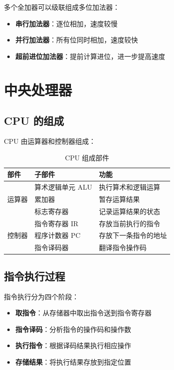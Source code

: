 \documentclass[12pt,UTF8]{ctexbook}
\begin{document}
多个全加器可以级联组成多位加法器：

\begin{itemize}[leftmargin=2cm]
    \item \textbf{串行加法器}：逐位相加，速度较慢
    \item \textbf{并行加法器}：所有位同时相加，速度较快
    \item \textbf{超前进位加法器}：提前计算进位，进一步提高速度
\end{itemize}

\chapter{中央处理器}
\label{chap:cpu}

\section{CPU 的组成}

CPU 由运算器和控制器组成：

\begin{table}[htbp]
    \centering
    \caption{CPU 组成部件}
    \begin{tabular}{|p{3cm}|p{3cm}|p{4cm}|}
        \hline
        \textbf{部件} & \textbf{子部件} & \textbf{功能} \\
        \hline
        \multirow{3}{*}{运算器} & 算术逻辑单元 ALU & 执行算术和逻辑运算 \\
        \cline{2-3}
         & 累加器 & 暂存运算结果 \\
        \cline{2-3}
         & 标志寄存器 & 记录运算结果的状态 \\
        \hline
        \multirow{3}{*}{控制器} & 指令寄存器 IR & 存放当前执行的指令 \\
        \cline{2-3}
         & 程序计数器 PC & 存放下一条指令的地址 \\
        \cline{2-3}
         & 指令译码器 & 翻译指令操作码 \\
        \hline
    \end{tabular}
\end{table}

\section{指令执行过程}

指令执行分为四个阶段：

\begin{itemize}[leftmargin=2cm]
    \item \textbf{取指令}：从存储器中取出指令送到指令寄存器
    \item \textbf{指令译码}：分析指令的操作码和操作数
    \item \textbf{执行指令}：根据译码结果执行相应操作
    \item \textbf{存储结果}：将执行结果存放到指定位置
\end{itemize}
\end{document}
